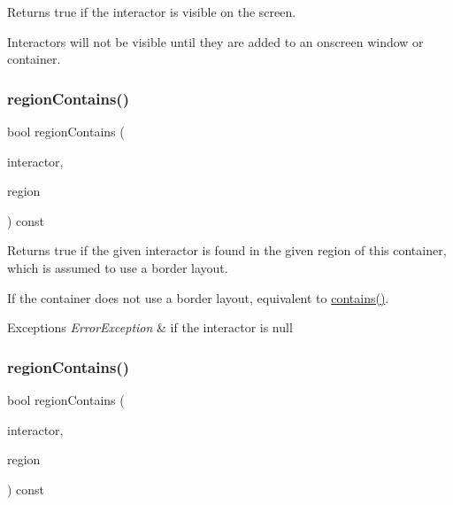 Returns true if the interactor is visible on the screen. 

Interactors will not be visible until they are added to an onscreen window or container. \mbox{\label{classGContainer_a8909db9abf4dc80058f9e4a7b90ea2d0}} 
\subsubsection{\texorpdfstring{region\+Contains()}{regionContains()}\hspace{0.1cm}{\footnotesize\ttfamily [1/4]}}
{\footnotesize\ttfamily bool region\+Contains (\begin{DoxyParamCaption}\item[{\mbox{\hyperlink{classGInteractor}{G\+Interactor}} $\ast$}]{interactor,  }\item[{\mbox{\hyperlink{classGContainer_a81a01a86de31071a92e6cce0bab9bc4b}{G\+Container\+::\+Region}}}]{region }\end{DoxyParamCaption}) const\hspace{0.3cm}{\ttfamily [virtual]}}



Returns true if the given interactor is found in the given region of this container, which is assumed to use a border layout. 

If the container does not use a border layout, equivalent to \mbox{\hyperlink{classGContainer_a29e67f98cd36414c67475b8941d861a6}{contains()}}. 
\begin{DoxyExceptions}{Exceptions}
{\em Error\+Exception} & if the interactor is null \\
\hline
\end{DoxyExceptions}
\mbox{\label{classGContainer_a84a56bae6b8883d27e44d51c31b2bfc5}} 
\subsubsection{\texorpdfstring{region\+Contains()}{regionContains()}\hspace{0.1cm}{\footnotesize\ttfamily [2/4]}}
{\footnotesize\ttfamily bool region\+Contains (\begin{DoxyParamCaption}\item[{\mbox{\hyperlink{classGInteractor}{G\+Interactor}} $\ast$}]{interactor,  }\item[{const std\+::string \&}]{region }\end{DoxyParamCaption}) const\hspace{0.3cm}{\ttfamily [virtual]}}



